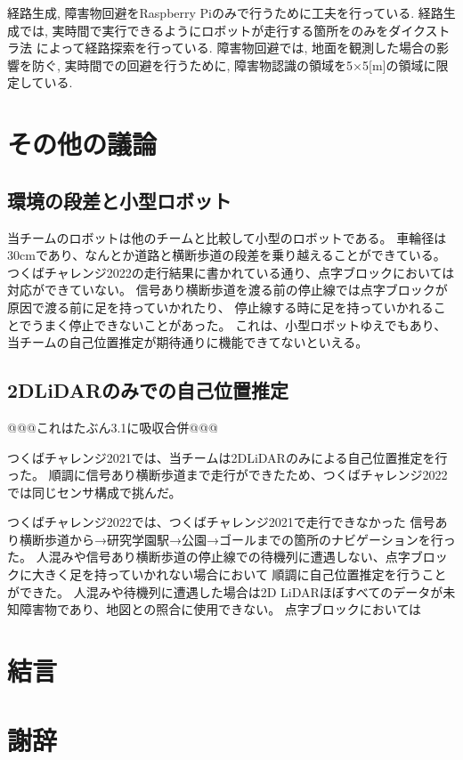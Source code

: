 \documentclass[twocolumn,9pt]{jsproceedings}
\begin{document}
経路生成, 障害物回避をRaspberry Piのみで行うために工夫を行っている. 
経路生成では, 実時間で実行できるようにロボットが走行する箇所をのみをダイクストラ法
によって経路探索を行っている. 障害物回避では, 地面を観測した場合の影響を防ぐ, 実時間での回避を行うために, 
障害物認識の領域を5×5[m]の領域に限定している. 

\section{その他の議論}

\subsection{環境の段差と小型ロボット}

当チームのロボットは他のチームと比較して小型のロボットである。
車輪径は30cmであり、なんとか道路と横断歩道の段差を乗り越えることができている。
つくばチャレンジ2022の走行結果に書かれている通り、点字ブロックにおいては対応ができていない。
信号あり横断歩道を渡る前の停止線では点字ブロックが原因で渡る前に足を持っていかれたり、
停止線する時に足を持っていかれることでうまく停止できないことがあった。
これは、小型ロボットゆえでもあり、当チームの自己位置推定が期待通りに機能できてないといえる。

\subsection{2DLiDARのみでの自己位置推定}

@@@これはたぶん3.1に吸収合併@@@

つくばチャレンジ2021では、当チームは2DLiDARのみによる自己位置推定を行った\cite{RTshop}。
順調に信号あり横断歩道まで走行ができたため、つくばチャレンジ2022では同じセンサ構成で挑んだ。

つくばチャレンジ2022では、つくばチャレンジ2021で走行できなかった
信号あり横断歩道から→研究学園駅→公園→ゴールまでの箇所のナビゲーションを行った。
人混みや信号あり横断歩道の停止線での待機列に遭遇しない、点字ブロックに大きく足を持っていかれない場合において
順調に自己位置推定を行うことができた。
人混みや待機列に遭遇した場合は2D LiDARほぼすべてのデータが未知障害物であり、地図との照合に使用できない。
点字ブロックにおいては

\section{結言}

\section*{謝辞}
\end{document}
